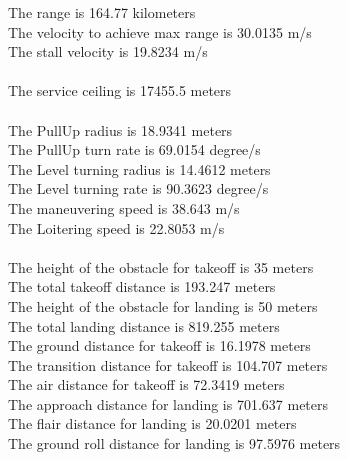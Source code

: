 \documentclass[12pt,A4paper]{article}
\begin{document}
	The range is 164.77 kilometers \\
	The velocity to achieve max range is 30.0135 m/s \\
	The stall velocity is 19.8234 m/s \\
	\\
	The service ceiling is 17455.5 meters \\
	\\
	The PullUp radius is 18.9341 meters\\
	The PullUp turn rate is 69.0154 degree/s \\
	The Level turning radius is 14.4612 meters\\
	The Level turning rate is 90.3623 degree/s \\
	The maneuvering speed is 38.643 m/s \\
	The Loitering speed is 22.8053 m/s \\
	\\	
	The height of the obstacle for takeoff is 35 meters \\
	The total takeoff distance is 193.247 meters \\
	The height of the obstacle for landing is 50 meters \\
	The total landing distance is 819.255 meters \\
	The ground distance for takeoff is 16.1978 meters  \\
	The transition distance for takeoff is 104.707 meters \\
	The air distance for takeoff is 72.3419 meters \\
	The approach distance for landing is 701.637 meters \\
	The flair distance for landing is 20.0201 meters \\
	The ground roll distance for landing is 97.5976 meters \\
\end{document}
